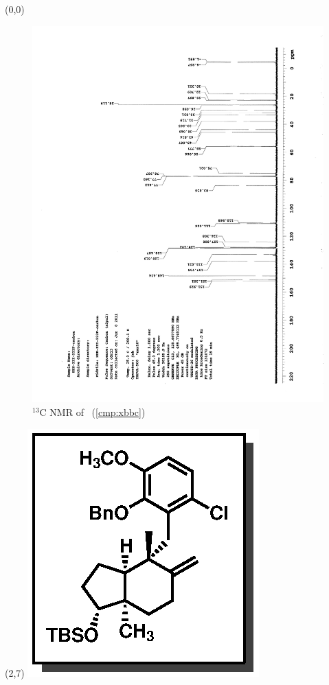 \clearpage
\begin{textblock}{20}(0,0)
\begin{figure}[htb]
\caption{$^{13}$C NMR of  \CMPxbbc\ (\ref{cmp:xbbc})}
\includegraphics[scale=0.75, trim = 0mm 0mm 0mm 5mm,
clip]{chp_singlecarbon/images/nmr/xbbcC}
\vspace{-100pt}
\end{figure}
\end{textblock}
\begin{textblock}{1}(2,7)
\includegraphics[scale=0.8, angle=90]{chp_singlecarbon/images/xbbc}
\end{textblock}
\clearpage

